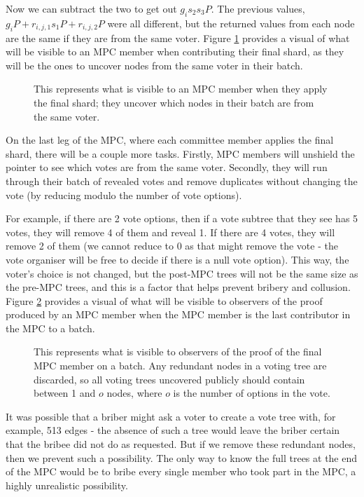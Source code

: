 \documentclass{article}
\begin{document}
Now we can subtract the two to get out $g_is_2s_3P$. The previous values, $g_iP + r_{i,j,1}s_1P + r_{i,j,2}P$ were all different, but the returned values from each node are the same if they are from the same voter. Figure \ref{fig:figure5} provides a visual of what will be visible to an MPC member when contributing their final shard, as they will be the ones to uncover nodes from the same voter in their batch.

\begin{figure}[h!]
        \centering
        
        \caption{This represents what is visible to an MPC member when they apply the final shard; they uncover which nodes in their batch are from the same voter.}
        \label{fig:figure5}
\end{figure}

On the last leg of the MPC, where each committee member applies the final shard, there will be a couple more tasks. Firstly, MPC members will unshield the pointer to see which votes are from the same voter. Secondly, they will run through their batch of revealed votes and remove duplicates without changing the vote (by reducing modulo the number of vote options).

For example, if there are 2 vote options, then if a vote subtree that they see has 5 votes, they will remove 4 of them and reveal 1. If there are 4 votes, they will remove 2 of them (we cannot reduce to 0 as that might remove the vote - the vote organiser will be free to decide if there is a null vote option). This way, the voter's choice is not changed, but the post-MPC trees will not be the same size as the pre-MPC trees, and this is a factor that helps prevent bribery and collusion. Figure \ref{fig:figure6} provides a visual of what will be visible to observers of the proof produced by an MPC member when the MPC member is the last contributor in the MPC to a batch.

\begin{figure}[h!]
        \centering
        
        \caption{This represents what is visible to observers of the proof of the final MPC member on a batch. Any redundant nodes in a voting tree are discarded, so all voting trees uncovered publicly should contain between 1 and $o$ nodes, where $o$ is the number of options in the vote.}
        \label{fig:figure6}
\end{figure}

It was possible that a briber might ask a voter to create a vote tree with, for example, 513 edges - the absence of such a tree would leave the briber certain that the bribee did not do as requested. But if we remove these redundant nodes, then we prevent such a possibility. The only way to know the full trees at the end of the MPC would be to bribe every single member who took part in the MPC, a highly unrealistic possibility.
\end{document}

